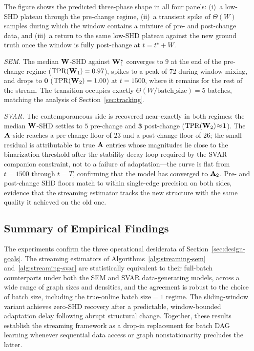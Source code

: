 \documentclass[journal,twoside]{IEEEtran}
\begin{document}
The figure shows the predicted three-phase shape in all four panels:
(i)~a low-SHD plateau through the pre-change regime, (ii)~a transient
spike of $\Theta(W)$ samples during which the window contains a
mixture of pre- and post-change data, and (iii)~a return to the same
low-SHD plateau against the new ground truth once the window is fully
post-change at $t = t^\star + W$.

\textit{SEM.} The median ${\mathbf W}$-SHD against ${\mathbf W}_1^\star$ converges
to $9$ at the end of the pre-change regime
($\mathrm{TPR}({\mathbf W}_1) = 0.97$), spikes to a peak of $72$ during
window mixing, and drops to
$\mathbf{0}$ ($\mathrm{TPR}({\mathbf W}_2) = 1.00$) at $t = 1500$, where it
remains for the rest of the stream. The transition occupies exactly
$\Theta(W / \mathrm{batch\_size}) = 5$ batches, matching the analysis
of Section~\ref{sec:tracking}.

\textit{SVAR.} The contemporaneous side is recovered near-exactly in
both regimes: the median ${\mathbf W}$-SHD settles to $5$ pre-change and
$\mathbf{3}$ post-change ($\mathrm{TPR}({\mathbf W}_2)\!\approx\!1$). The
${\mathbf A}$-side reaches a pre-change floor of $23$ and a post-change
floor of $26$; the small residual is attributable to true ${\mathbf A}$
entries whose magnitudes lie close to the binarization threshold
after the stability-decay loop required by the SVAR companion
constraint, not to a failure of adaptation---the curve is flat from
$t = 1500$ through $t = T$, confirming that the model has converged
to ${\mathbf A}_2$. Pre- and post-change SHD floors match to within
single-edge precision on both sides, evidence that the streaming
estimator tracks the new structure with the same quality it achieved
on the old one.

\subsection{Summary of Empirical Findings}
\label{sec:exp-summary}
The experiments confirm the three operational desiderata of
Section~\ref{sec:design-goals}. The streaming estimators of
Algorithms~\ref{alg:streaming-sem} and~\ref{alg:streaming-svar} are
statistically equivalent to their full-batch counterparts under both
the SEM and SVAR data-generating models, across a wide range of graph
sizes and densities, and the agreement is robust to the choice of
batch size, including the true-online $\mathrm{batch\_size} = 1$
regime. The sliding-window variant achieves zero-SHD recovery after a
predictable, window-bounded adaptation delay following abrupt
structural change. Together, these results establish the streaming
framework as a drop-in replacement for batch DAG learning whenever
sequential data access or graph nonstationarity precludes the latter.
\end{document}
